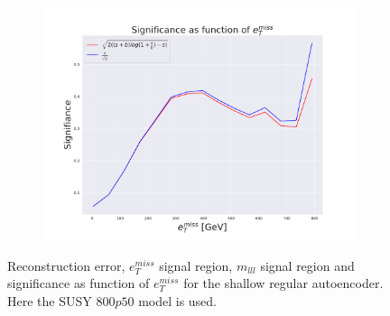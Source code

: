 \begin{figure}[H]
    \hfill  
    \begin{subfigure}{.60\textwidth}
        \includegraphics[width=\textwidth]{Figures/AE_testing/small/2lep/significance_etmiss_800p0p050_-1.6117055611472277.pdf}
        \caption{}
        \label{fig:AE_2lep_small_signi_800}
    \end{subfigure}
    \hfill      
    \caption[2lep shallow network | $800p50$ | AE]{Reconstruction error, $e_T^{miss}$ signal region, $m_{lll}$ signal region and significance as function of 
    $e_T^{miss}$ for the shallow regular autoencoder. Here the SUSY $800p50$ model is used.}
    \label{fig:AE_2lep_small_rec_sig_signi_800}
\end{figure}


